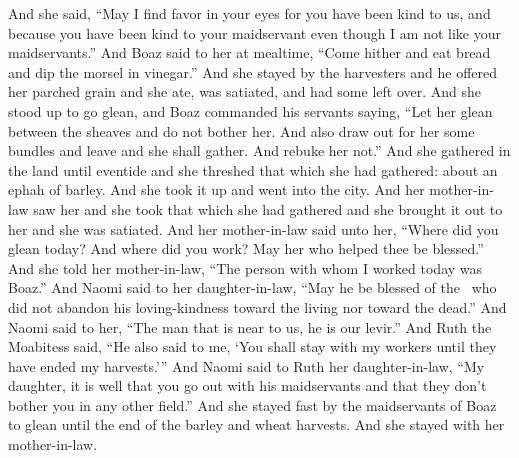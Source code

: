\begin{inparaenum}
   And she said, ``May I find favor in your eyes for you have been kind to us, and because you have been kind to your maidservant even though I am not like your maidservants.''%
   And Boaz said to her at mealtime, ``Come hither and eat bread and dip the morsel in vinegar.'' And she stayed by the harvesters and he offered her parched grain and she ate, was satiated, and had some left over.%
   And she stood up to go glean, and Boaz commanded his servants saying, ``Let her glean between the sheaves and do not bother her.%
   And also draw out for her some bundles and leave and she shall gather. And rebuke her not.''%
   And she gathered in the land until eventide and she threshed that which she had gathered: about an ephah of barley.%
   And she took it up and went into the city. And her mother-in-law saw her and she took that which she had gathered and she brought it out to her and she was satiated.%
   And her mother-in-law said unto her, ``Where did you glean today? And where did you work? May her who helped thee be blessed.'' And she told her mother-in-law, ``The person with whom I worked today was Boaz.''%
   And Naomi said to her daughter-in-law, ``May he be blessed of the \lord\ who did not abandon his loving-kindness toward the living nor toward the dead.'' And Naomi said to her, ``The man that is near to us, he is our levir.''%
   And Ruth the Moabitess said, ``He also said to me, `You shall stay with my workers until they have ended my harvests.'''%
   And Naomi said to Ruth her daughter-in-law, ``My daughter, it is well that you go out with his maidservants and that they don't bother you in any other field.''%
   And she stayed fast by the maidservants of Boaz to glean until the end of the barley and wheat harvests. And she stayed with her mother-in-law.%
\end{inparaenum}
